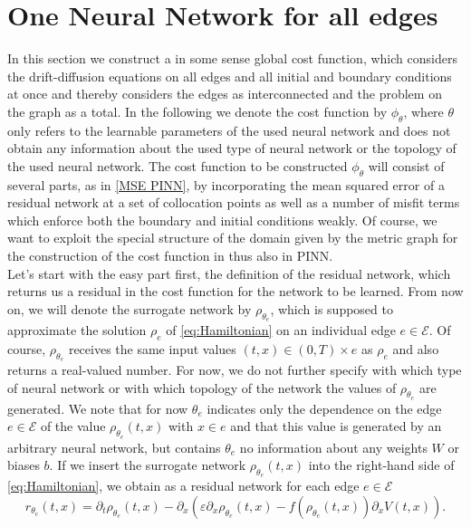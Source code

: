 \section{One Neural Network for all edges}
\label{ch3:sec1}

In this section we construct a in some sense global cost function, which considers the drift-diffusion equations on all edges and all initial and boundary conditions at once and thereby considers the edges as interconnected and the problem on the graph as a total. In the following we denote the cost function by $\phi_\theta$, where $\theta$ only refers to the learnable parameters of the used neural network and does not obtain any information about the used type of neural network or the topology of the used neural network. The cost function to be constructed $\phi_\theta$ will consist of several parts, as in \cref{MSE PINN}, by incorporating the mean squared error of a residual network at a set of collocation points as well as a number of misfit terms which enforce both the boundary and initial conditions weakly. Of course, we want to exploit the special structure of the domain given by the metric graph for the construction of the cost function in thus also in PINN. \\
Let's start with the easy part first, the definition of the residual network, which returns us a residual in the cost function for the network to be learned. From now on, we will denote the surrogate network by $\rho_{\theta_e}$, which is supposed to approximate the solution $\rho_e$ of \cref{eq:Hamiltonian} on an individual edge $e \in \mathcal{E}$. Of course, $\rho_{\theta_e}$ receives the same input values $(t, x) \in (0, T) \times e$ as $\rho_e$ and also returns a real-valued number. For now, we do not further specify with which type of neural network or with which topology of the network the values of $\rho_{\theta_e}$ are generated. We note that for now $\theta_e$ indicates only the dependence on the edge $e \in \mathcal{E}$ of the value $\rho_{\theta_e}(t,x)$ with $x \in e$ and that this value is generated by an arbitrary neural network, but contains $\theta_e$ no information about any weights $W$ or biases $b$. If we insert the surrogate network $\rho_{\theta_e}(t,x)$ into the right-hand side of \cref{eq:Hamiltonian}, we obtain as a residual network for each edge $e \in \mathcal{E}$
\begin{equation}
    \label{Drift-Diffusion residual network}
    r_{\theta_e}(t,x)=\partial_t \rho_{\theta_e}(t,x) - \partial_x  ( \varepsilon \partial_x  \rho_{\theta_e}(t,x) - f(\rho_{\theta_e}(t,x)) \partial_x V(t,x)).
\end{equation}
